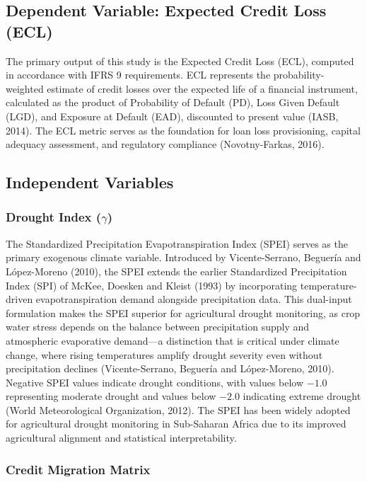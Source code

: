 \documentclass[12pt,a4paper]{article}
\begin{document}
\subsection{Dependent Variable: Expected Credit Loss (ECL)}

The primary output of this study is the Expected Credit Loss (ECL), computed in accordance with IFRS 9 requirements. ECL represents the probability-weighted estimate of credit losses over the expected life of a financial instrument, calculated as the product of Probability of Default (PD), Loss Given Default (LGD), and Exposure at Default (EAD), discounted to present value (IASB, 2014). The ECL metric serves as the foundation for loan loss provisioning, capital adequacy assessment, and regulatory compliance (Novotny-Farkas, 2016).

\subsection{Independent Variables}

\subsubsection{Drought Index ($\gamma$)}

The Standardized Precipitation Evapotranspiration Index (SPEI) serves as the primary exogenous climate variable. Introduced by Vicente-Serrano, Beguer\'ia and L\'opez-Moreno (2010), the SPEI extends the earlier Standardized Precipitation Index (SPI) of McKee, Doesken and Kleist (1993) by incorporating temperature-driven evapotranspiration demand alongside precipitation data. This dual-input formulation makes the SPEI superior for agricultural drought monitoring, as crop water stress depends on the balance between precipitation supply and atmospheric evaporative demand---a distinction that is critical under climate change, where rising temperatures amplify drought severity even without precipitation declines (Vicente-Serrano, Beguer\'ia and L\'opez-Moreno, 2010). Negative SPEI values indicate drought conditions, with values below $-1.0$ representing moderate drought and values below $-2.0$ indicating extreme drought (World Meteorological Organization, 2012). The SPEI has been widely adopted for agricultural drought monitoring in Sub-Saharan Africa due to its improved agricultural alignment and statistical interpretability.

\subsubsection{Credit Migration Matrix}
\end{document}
